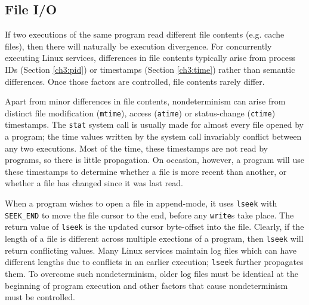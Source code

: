 \subsection{File I/O} \label{ch3:fileio}
 \newline
If two executions of the same program read different
file contents (e.g. cache files), then
there will naturally be execution divergence.
For concurrently executing Linux services,
differences in file contents typically arise
from process IDs (Section \ref{ch3:pid}) or timestamps (Section \ref{ch3:time})
rather than semantic differences.
Once those factors are controlled, file contents rarely differ. \newline

 \newline
Apart from minor differences in file contents,
nondeterminism can arise from distinct file 
modification (\texttt{mtime}), access (\texttt{atime}) or status-change (\texttt{ctime})
timestamps.
The \texttt{stat} system call is usually made for almost
every file opened by a program; the time values
written by the system call invariably
conflict between any two executions. Most of the time,
these timestamps are not read by programs,
so there is little propagation. On occasion, 
however, a program will use these timestamps
to determine whether a file is more recent than another,
or whether a file has changed since
it was last read. \newline

 \newline
When a program wishes to open
a file in append-mode, it uses \texttt{lseek}
with \texttt{SEEK\_END} to move
the file cursor to the end,
before any \texttt{write}s take place.
The return value of \texttt{lseek} is the
updated cursor byte-offset into the file.
Clearly, if the length of a file is different across
multiple exections of a program, then
\texttt{lseek} will return conflicting values.
Many Linux services maintain log files
which can have different lengths due
to conflicts in an earlier execution; \texttt{lseek}
further propagates them. To overcome
such nondeterminism, older log files
must be identical at the beginning 
of program execution and other
factors that cause nondeterminism
must be controlled. 

\newpage

